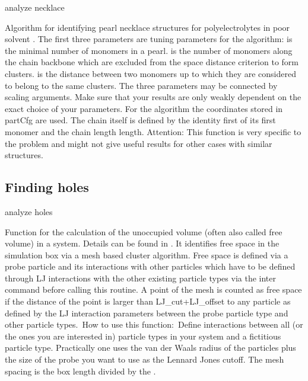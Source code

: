 \begin{essyntax}
 analyze necklace   
  
\end{essyntax}
Algorithm for identifying pearl necklace structures for
polyelectrolytes in poor solvent \citep{limbach03a}. The first three
parameters are tuning parameters for the algorithm:
 is the minimal number of monomers in a pearl.
 is the number of monomers along the chain backbone
which are excluded from the space distance criterion to form clusters.
 is the distance between two monomers up to which
they are considered to belong to the same clusters. The three
parameters may be connected by scaling arguments. Make sure that your
results are only weakly dependent on the exact choice of your
parameters. For the algorithm the coordinates stored in partCfg are
used. The chain itself is defined by the identity first of its first
monomer and the chain length length.  Attention: This function is very
specific to the problem and might not give useful results for other
cases with similar structures.

\subsection{Finding holes}
\label{analyze:holes}

\begin{essyntax}
  analyze holes  
  \begin{features}
  \end{features}
\end{essyntax}
Function for the calculation of the unoccupied volume (often also
called free volume) in a system. Details can be found in
\citet{schmitz00a}.  It identifies free space in the simulation box
via a mesh based cluster algorithm.  Free space is defined via a probe
particle and its interactions with other particles which have to be
defined through LJ interactions with the other existing particle types
via the inter command before calling this routine. A point of the mesh
is counted as free space if the distance of the point is larger than
LJ_cut+LJ_offset to any particle as defined by the LJ interaction
parameters between the probe particle type and other particle types.\
How to use this function:\ Define interactions between all (or the
ones you are interested in) particle types in your system and a
fictitious particle type.  Practically one uses the van der Waals radius
of the particles plus the size of the probe you want to use as the
Lennard Jones cutoff. The mesh spacing is the box length divided by
the \var{mesh_size}.


